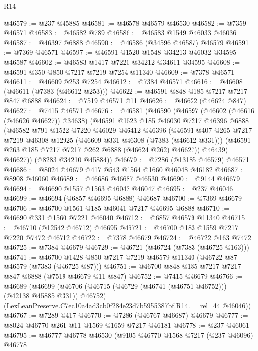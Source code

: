 \begin{lexlean}{R14}
\begin{coremodule}
@46579 := @237 @45885
@46581 := @46578 @46579 @46530
@46582 := @7359 @46571
@46583 := @46582 @789
@46586 := @46583 @1549 @46033 @46036
@46587 := @46397 @6888
@46590 := @46586 (@34596 @46587) @46579
@46591 := @7369 @46571
@46597 := @46591 @1520 @1548 @34213 @46032 @34595 @46587
@46602 := @46583 @1417 @7220 @34212 @34611 @34595
@46608 := @46591 @350 @850 @7217 @7219 @7254 @11340
@46609 := @7378 @46571
@46611 := @46609 @253 @7254
@46612 := @7384 @46571
@46616 := @46608 (@46611 (@7383 (@46612 @253)))
@46622 := @46591 @848 @185 @7217 @7217 @847 @6888
@46624 := @7519 @46571 @11
@46626 := @46622 (@46624 @847)
@46627 := @7415 @46571
@46676 := @46581
    (@46590
      (@46597
        (@46602 (@46616 (@46626 @46627)) @34638)
        (@46591
          @1523
          @185
          @46030
          @7217
          @46396
          @6888
          (@46582
            @791
            @1522
            @7220
            @46029
            @46412
            @46396
            (@46591
              @407
              @265
              @7217
              @7219
              @46308
              @12925
              (@46609 @331 @46308 (@7383 (@46612 @331)))
              (@46591 @263 @185 @7217 @7217 @262 @6888 (@46624 @262) @46627))
            @46439)
          @46627))
      (@8283 @34210 @45884))
@46679 := @7286 (@13185 @46579) @46571
@46686 := @8024 @46679 @417 @543 @1564 @1660 @46048 @46182
@46687 := @8908 @46060
@46689 := @46686 @46687 @46530
@46690 := @9144 @46679
@46694 := @46690 @1557 @1563 @46043 @46047
@46695 := @237 @46046
@46699 := @46694 (@6857 @46695 @6888) @46687
@46700 := @7369 @46679
@46706 := @46700 @1561 @185 @46041 @7217 @46695 @6888
@46710 := @46690 @331 @1560 @7221 @46040
@46712 := @6857 @46579 @11340
@46715 := @46710 (@12542 @46712) @46695
@46721 := @46700 @183 @1559 @7217 @7220 @7472 @46712
@46722 := @7378 @46679
@46724 := @46722 @163 @7472
@46725 := @7384 @46679
@46729 := @46721 (@46724 (@7383 (@46725 @163)))
@46741 := @46700 @1428 @850 @7217 @7219 @46579 @11340 (@46722 @87 @46579 (@7383 (@46725 @87)))
@46751 := @46700 @848 @185 @7217 @7217 @847 @6888 (@7519 @46679 @11 @847)
@46752 := @7415 @46679
@46766 := @46689
    (@46699
      (@46706 (@46715 (@46729 (@46741 (@46751 @46752))) (@42138 @45885 @331)) @46752)
      (LexLeanPreserve.C7ec10a4ad3cb0f284e23d7b5955387bf.R14.__rel_44 @46046))
@46767 := @7289 @417
@46770 := @7286 (@46767 @46687) @46679
@46777 := @8024 @46770 @261 @11 @1569 @1659 @7217 @46181
@46778 := @237 @46061
@46795 := @46777
    @46778
    @46530
    (@9105
      @46770
      @1568
      @7217
      (@237 @46096)
      @46778

\end{coremodule}
\end{lexlean}
